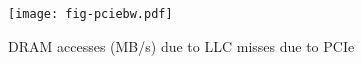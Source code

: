 \begin{figure}[H]
\texttt{[image: fig-pciebw.pdf]}
\caption{DRAM accesses (MB/s) due to LLC misses due to PCIe}
\label{fig:pciebw}
\end{figure}
